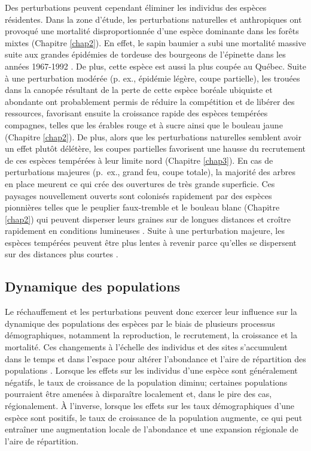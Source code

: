 Des perturbations peuvent cependant éliminer les individus des espèces
résidentes. Dans la zone d'étude, les perturbations naturelles et
anthropiques ont provoqué une mortalité disproportionnée d'une espèce
dominante dans les forêts mixtes (Chapitre \ref{chap2}). En effet, le
sapin baumier a subi une mortalité massive suite aux grandes épidémies
de tordeuse des bourgeons de l'épinette dans les années 1967-1992
\citep{duchesne_population_2008}. De plus, cette espèce est aussi la
plus coupée au Québec. Suite à une perturbation modérée (p. ex.,
épidémie légère, coupe partielle), les trouées dans la canopée résultant
de la perte de cette espèce boréale ubiquiste et abondante ont
probablement permis de réduire la compétition et de libérer des
ressources, favorisant ensuite la croissance rapide des espèces
tempérées compagnes, telles que les érables rouge et à sucre ainsi que
le bouleau jaune (Chapitre \ref{chap2}). De plus, alors que les
perturbations naturelles semblent avoir un effet plutôt délétère, les
coupes partielles favorisent une hausse du recrutement de ces espèces
tempérées à leur limite nord (Chapitre \ref{chap3}). En cas de
perturbations majeures (p.~ex., grand feu, coupe totale), la majorité
des arbres en place meurent ce qui crée des ouvertures de très grande
superficie. Ces paysages nouvellement ouverts sont colonisés rapidement
par des espèces pionnières telles que le peuplier faux-tremble et le
bouleau blanc (Chapitre \ref{chap2}) qui peuvent disperser leurs graines
sur de longues distances et croître rapidement en conditions lumineuses
\citep{boucher_fire_2017, grondin_have_2018}. Suite à une perturbation
majeure, les espèces tempérées peuvent être plus lentes à revenir parce
qu'elles se dispersent sur des distances plus courtes
\citep{scheller_spatially_2005}.

\hypertarget{dynamique-des-populations}{%
\subsection{Dynamique des populations}\label{dynamique-des-populations}}

Le réchauffement et les perturbations peuvent donc exercer leur
influence sur la dynamique des populations des espèces par le biais de
plusieurs processus démographiques, notamment la reproduction, le
recrutement, la croissance et la mortalité. Ces changements à l'échelle
des individus et des sites s'accumulent dans le temps et dans l'espace
pour altérer l'abondance et l'aire de répartition des populations
\citep{holt_theoretical_2005}. Lorsque les effets sur les individus
d'une espèce sont généralement négatifs, le taux de croissance de la
population diminu; certaines populations pourraient être amenées à
disparaître localement et, dans le pire des cas, régionalement. À
l'inverse, lorsque les effets sur les taux démographiques d'une espèce
sont positifs, le taux de croissance de la population augmente, ce qui
peut entraîner une augmentation locale de l'abondance et une expansion
régionale de l'aire de répartition.

